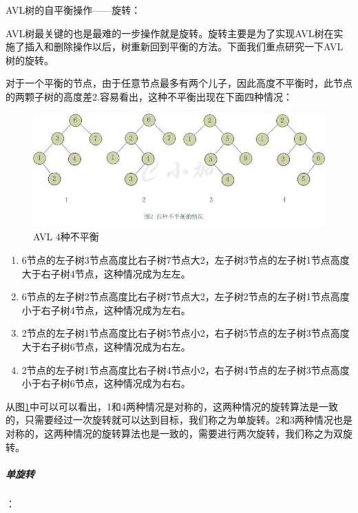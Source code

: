 \documentclass[UTF8,a4paper,12pt]{ctexbook}
\begin{document}
			AVL树的自平衡操作——旋转：
			
			AVL树最关键的也是最难的一步操作就是旋转。旋转主要是为了实现AVL树在实施了插入和删除操作以后，树重新回到平衡的方法。下面我们重点研究一下AVL树的旋转。
			
			对于一个平衡的节点，由于任意节点最多有两个儿子，因此高度不平衡时，此节点的两颗子树的高度差2.容易看出，这种不平衡出现在下面四种情况：
			\begin{figure}[h]
				\centering
				\includegraphics[scale = 0.8]{AVL.jpg}
				\caption{AVL 4种不平衡}
				\label{AVL}
			\end{figure}
				
			\begin{enumerate}[itemindent = 1em,label = (\arabic{enumi})]
				\item  6节点的左子树3节点高度比右子树7节点大2，左子树3节点的左子树1节点高度大于右子树4节点，这种情况成为左左。
				\item  6节点的左子树2节点高度比右子树7节点大2，左子树2节点的左子树1节点高度小于右子树4节点，这种情况成为左右。
				\item  2节点的左子树1节点高度比右子树5节点小2，右子树5节点的左子树3节点高度大于右子树6节点，这种情况成为右左。
				\item  2节点的左子树1节点高度比右子树4节点小2，右子树4节点的左子树3节点高度小于右子树6节点，这种情况成为右右。
			\end{enumerate}
			
			从图\ref{AVL}中可以可以看出，1和4两种情况是对称的，这两种情况的旋转算法是一致的，只需要经过一次旋转就可以达到目标，我们称之为单旋转。2和3两种情况也是对称的，这两种情况的旋转算法也是一致的，需要进行两次旋转，我们称之为双旋转。
				
			\subparagraph{单旋转}：
			
\end{document}
